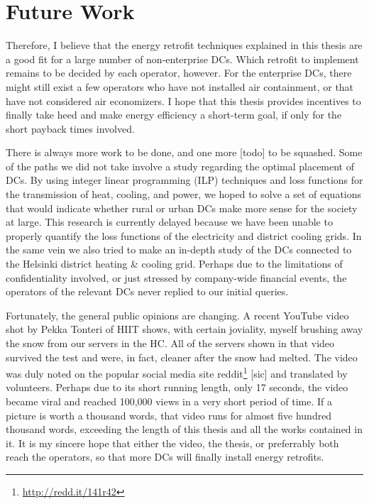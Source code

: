 \documentclass[officiallayout]{tktla}
\begin{document}
\section{Future Work}
\label{sec:future}

Therefore, I believe that the energy retrofit techniques explained in this
thesis are a good fit for a large number of non-enterprise DCs. Which retrofit
to implement remains to be decided by each operator, however. For the
enterprise DCs, there might still exist a few operators who have not installed
air containment, or that have not considered air economizers. I hope that this
thesis provides incentives to finally take heed and make energy efficiency a
short-term goal, if only for the short payback times involved.

There is always more work to be done, and one more [todo] to be squashed.
Some of the paths we did not take involve a study regarding the optimal
placement of DCs. By using integer linear programming (ILP) techniques and
loss functions for the transmission of heat, cooling, and power, we hoped to
solve a set of equations that would indicate whether rural or urban DCs make
more sense for the society at large. This research is currently delayed
because we have been unable to properly quantify the loss functions of the
electricity and district cooling grids. In the same vein we also tried to make
an in-depth study of the DCs connected to the Helsinki district heating \&
cooling grid. Perhaps due to the limitations of confidentiality involved, or
just stressed by company-wide financial events, the operators of the relevant
DCs never replied to our initial queries.

Fortunately, the general public opinions are changing. A recent YouTube video
shot by Pekka Tonteri of HIIT shows, with certain joviality, myself brushing
away the snow from our servers in the HC. All of the servers shown in that
video survived the test and were, in fact, cleaner after the snow had melted.
The video was duly noted on the popular social media site
reddit\footnote{\url{http://redd.it/141r42}} [sic] and translated by
volunteers. Perhaps due to its short running length, only 17 seconds, the
video became viral and reached 100,000 views in a very short period of time.
If a picture is worth a thousand words, that video runs for almost five
hundred thousand words, exceeding the length of this thesis and all the works
contained in it. It is my sincere hope that either the video, the thesis, or
preferrably both reach the operators, so that more DCs will finally install
energy retrofits.


\renewcommand*{\bibfont}{\raggedright}






\end{document}
